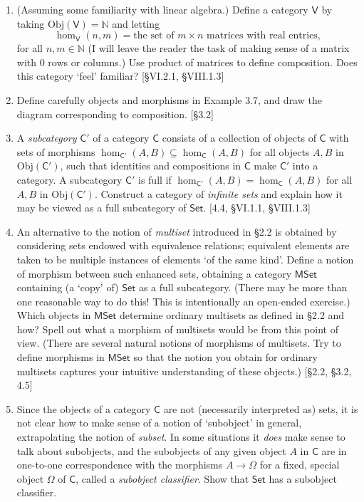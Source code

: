 \begin{enumerate}
    \item (Assuming some familiarity with linear algebra.) Define a category $\mathsf{V}$ by taking $\mathrm{Obj}(\mathsf{V}) = \mathbb{N}$ and letting \[ \hom_{\mathsf{V}}(n, m) = \text{the set of } m \times n \text{ matrices with real entries},\] for all $n, m \in \mathbb{N}$ (I will leave the reader the task of making sense of a matrix with 0 rows or columns.) Use product of matrices to define composition. Does this category `feel' familiar? [\S VI.2.1, \S VIII.1.3]

    \item Define carefully objects and morphisms in Example 3.7, and draw the diagram corresponding to composition. [\S3.2]

    \item A \textit{subcategory} $\mathsf{C}'$ of a category $\mathsf{C}$ consists of a collection of objects of $\mathsf{C}$ with sets of morphisms $\hom_{\mathsf{C}'}(A, B) \subseteq \hom_{\mathsf{C}}(A, B)$ for all objects $A, B$ in $\mathrm{Obj}(\mathsf{C}')$, such that identities and compositions in $\mathsf{C}$ make $\mathsf{C}'$ into a category. A subcategory $\mathsf{C}'$ is full if $\hom_{\mathsf{C}'}(A, B) = \hom_{\mathsf{C}}(A, B)$ for all $A, B$ in $\mathrm{Obj}(\mathsf{C}')$. Construct a category of \textit{infinite sets} and explain how it may be viewed as a full subcategory of $\mathsf{Set}$. [4.4, \S VI.1.1, \S VIII.1.3]

    \item An alternative to the notion of \textit{multiset} introduced in \S2.2 is obtained by considering sets endowed with equivalence relations; equivalent elements are taken to be multiple instances of elements `of the same kind'. Define a notion of morphism between such enhanced sets, obtaining a category $\mathsf{MSet}$ containing (a `copy' of) $\mathsf{Set}$ as a full subcategory. (There may be more than one reasonable way to do this! This is intentionally an open-ended exercise.) Which objects in $\mathsf{MSet}$ determine ordinary multisets as defined in \S2.2 and how? Spell out what a morphism of multisets would be from this point of view. (There are several natural notions of morphisms of multisets. Try to define morphisms in $\mathsf{MSet}$ so that the notion you obtain for ordinary multisets captures your intuitive understanding of these objects.) [\S2.2, \S3.2, 4.5]
        
    \item Since the objects of a category $\mathsf{C}$ are not (necessarily interpreted as) sets, it is not clear how to make sense of a notion of `subobject' in general, extrapolating the notion of \emph{subset}. In some situations it \textit{does} make sense to talk about subobjects, and the subobjects of any given object $A$ in $\mathsf{C}$ are in one-to-one correspondence with the morphisms $A \to \Omega$ for a fixed, special object $\Omega$ of $\mathsf{C}$, called a \textit{subobject classifier}. Show that $\mathsf{Set}$ has a subobject classifier.
    

\end{enumerate}
